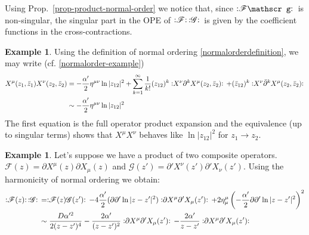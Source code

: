 \documentclass{report}
\theoremstyle{plain}
\theoremstyle{definition}
\newtheorem{example}[theorem]{Example}
\theoremstyle{remark}
\newcommand{\FR}[2]{\frac{#1}{#2}}
\newcommand{\ms}{\mathscr}
\newcommand{\sg}{\sigma}
\newcommand{\di}{\partial}
\newcommand{\NO}[1]{\vcentcolon\mathrel{#1}\vcentcolon\,}
\begin{document}
Using Prop.~\ref{prop-product-normal-order} we notice that, since
$\NO{\ms F\ms g}$ is non-singular, the singular
part in the OPE of $\NO{\ms F}\NO{\ms G}$ is given by the coefficient
functions in the cross-contractions.


\begin{example} Using the definition of normal ordering
\eqref{normalorderdefinition}, we may write (cf.
\eqref{normalorder-example})
\begin{align*}
    X^\mu(z_1,\bar z_1)X^\nu(z_2,\bar z_2) &=
    -\FR{\alpha'}{2}\eta^{\mu\nu}\ln|z_{12}|^2 +\sum_{k=1}^\infty \FR{1}{k!}
    (z_{12})^k \NO{X^\nu\di^k X^\mu(z_2,\bar z_2)}
    +(\bar z_{12})^k \NO{X^\nu\bar\di^k X^\mu(z_2,\bar z_2)}\\
    &\sim -\FR{\alpha'}{2}\eta^{\mu\nu}\ln|z_{12}|^2
\end{align*}
The first equation is the full operator product expansion and the
equivalence (up to singular terms) shows that $X^\mu X^\nu$ behaves like
$\ln|z_{12}|^2$ for $z_1\to z_2$.
\end{example}
\begin{example} Let's suppose we have a product of two composite operators.
$\ms F(z) = \di X^\mu(z)\di X_\mu(z)$ and $\ms G(z') = \di'
X^\nu(z')\di'X_\nu(z')$.  Using the harmonicity of normal ordering we
obtain:
\begin{align*}
\NO{\ms F(z)}\NO{\ms G} &= \NO{\ms F(z)\ms G(z')} - 4 \FR{\alpha'}{2}
(\di\di' \ln|z-z'|^2) \NO{\di X^\mu \di' X_\mu(z')}
+2\eta^\mu_\mu \left( -\FR{\alpha'}{2}\di\di'\ln|z-z'|^2 \right)^2\\
&\sim \FR{D\alpha'^2}{2(z-z')^4}-\FR{2\alpha'}{(z-z')^2}\NO{\di X^\mu \di'
X_\mu(z')} - \FR{2\alpha'}{z-z'} \NO{\di X^\mu \di' X_\mu(z')}
\end{align*}
\end{example}
\end{document}
